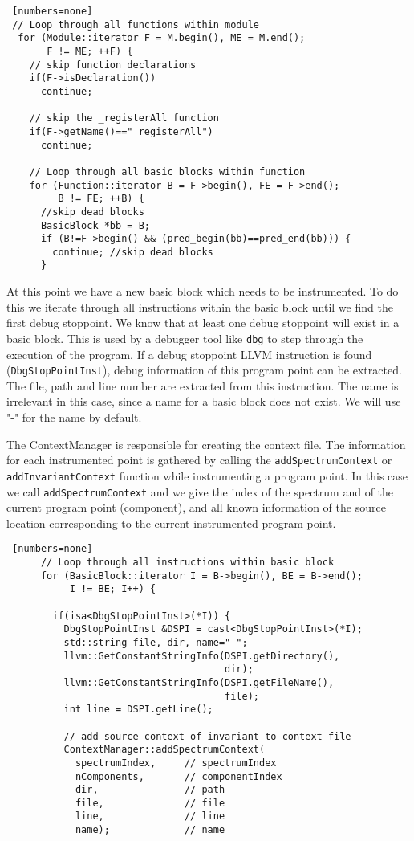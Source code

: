 \begin{lstlisting} [numbers=none]
 // Loop through all functions within module
  for (Module::iterator F = M.begin(), ME = M.end(); 
       F != ME; ++F) {
    // skip function declarations
    if(F->isDeclaration()) 
      continue;

    // skip the _registerAll function
    if(F->getName()=="_registerAll")
      continue;

    // Loop through all basic blocks within function
    for (Function::iterator B = F->begin(), FE = F->end(); 
         B != FE; ++B) {
      //skip dead blocks
      BasicBlock *bb = B;
      if (B!=F->begin() && (pred_begin(bb)==pred_end(bb))) {
        continue; //skip dead blocks
      }
\end{lstlisting}

At this point we have a new basic block which needs to be instrumented.
To do this we iterate through all instructions within the 
basic block until we find the first debug stoppoint.
We know that at least one debug stoppoint will exist
in a basic block.
This is used by a debugger tool like \texttt{dbg} to step through the
execution of the program.
If a debug stoppoint LLVM instruction is found (\texttt{DbgStopPointInst}),
debug information of this program point can be extracted.
The file, path and line number are extracted from this instruction.
The name is irrelevant in this case, since a name for a basic block 
does not exist. We will use "-" for the name by default.

The ContextManager is responsible for creating the context file.
The information for each instrumented point is gathered by calling
the \texttt{addSpectrumContext} or \texttt{addInvariantContext} 
function while instrumenting a program point.
In this case we call \texttt{addSpectrumContext} and we give the
index of the spectrum and of the current program point (component), 
and all known information of the source location corresponding to
the current instrumented program point.


\begin{lstlisting} [numbers=none]
      // Loop through all instructions within basic block
      for (BasicBlock::iterator I = B->begin(), BE = B->end(); 
           I != BE; I++) {

        if(isa<DbgStopPointInst>(*I)) {
          DbgStopPointInst &DSPI = cast<DbgStopPointInst>(*I);
          std::string file, dir, name="-";
          llvm::GetConstantStringInfo(DSPI.getDirectory(), 
                                      dir);
          llvm::GetConstantStringInfo(DSPI.getFileName(), 
                                      file);
          int line = DSPI.getLine();

          // add source context of invariant to context file
          ContextManager::addSpectrumContext(
            spectrumIndex,     // spectrumIndex
            nComponents,       // componentIndex
            dir,               // path
            file,              // file
            line,              // line
            name);             // name
\end{lstlisting}

